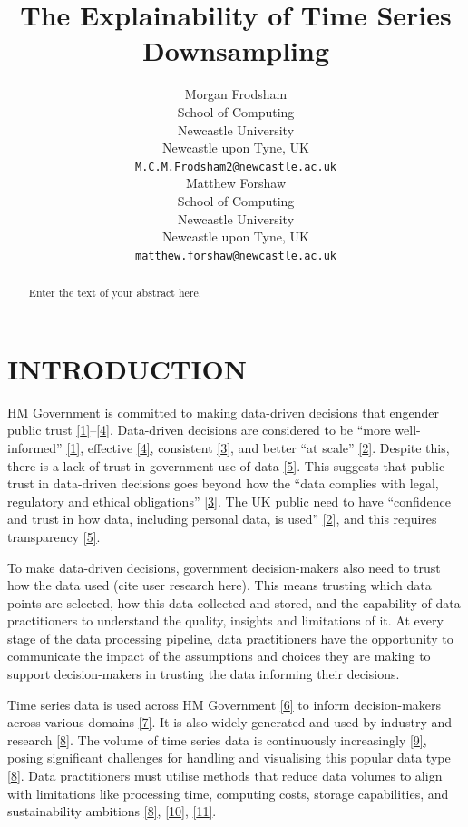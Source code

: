 \documentclass{article}
\title{The Explainability of Time Series Downsampling}
\author{
    Morgan Frodsham
   \\
    School of Computing \\
    Newcastle University \\
  Newcastle upon Tyne, UK \\
  \texttt{\href{mailto:M.C.M.Frodsham2@newcastle.ac.uk}{\nolinkurl{M.C.M.Frodsham2@newcastle.ac.uk}}} \\
   \And
    Matthew Forshaw
   \\
    School of Computing \\
    Newcastle University \\
  Newcastle upon Tyne, UK \\
  \texttt{\href{mailto:matthew.forshaw@newcastle.ac.uk}{\nolinkurl{matthew.forshaw@newcastle.ac.uk}}} \\
  }
\begin{document}
\maketitle


\begin{abstract}
Enter the text of your abstract here.
\end{abstract}


\twocolumn

\hypertarget{introduction}{%
\section{INTRODUCTION}\label{introduction}}

HM Government is committed to making data-driven decisions that engender
public trust
\protect\hyperlink{ref-data2017}{{[}1{]}}--\protect\hyperlink{ref-data2022}{{[}4{]}}.
Data-driven decisions are considered to be ``more well-informed''
\protect\hyperlink{ref-data2017}{{[}1{]}}, effective
\protect\hyperlink{ref-data2022}{{[}4{]}}, consistent
\protect\hyperlink{ref-data2021}{{[}3{]}}, and better ``at scale''
\protect\hyperlink{ref-data2020}{{[}2{]}}. Despite this, there is a lack
of trust in government use of data
\protect\hyperlink{ref-trust}{{[}5{]}}. This suggests that public trust
in data-driven decisions goes beyond how the ``data complies with legal,
regulatory and ethical obligations''
\protect\hyperlink{ref-data2021}{{[}3{]}}. The UK public need to have
``confidence and trust in how data, including personal data, is used''
\protect\hyperlink{ref-data2020}{{[}2{]}}, and this requires
transparency \protect\hyperlink{ref-trust}{{[}5{]}}.

To make data-driven decisions, government decision-makers also need to
trust how the data used (cite user research here). This means trusting
which data points are selected, how this data collected and stored, and
the capability of data practitioners to understand the quality, insights
and limitations of it. At every stage of the data processing pipeline,
data practitioners have the opportunity to communicate the impact of the
assumptions and choices they are making to support decision-makers in
trusting the data informing their decisions.

Time series data is used across HM Government
\protect\hyperlink{ref-pathway}{{[}6{]}} to inform decision-makers
across various domains \protect\hyperlink{ref-onstool}{{[}7{]}}. It is
also widely generated and used by industry and research
\protect\hyperlink{ref-TVStore}{{[}8{]}}. The volume of time series data
is continuously increasingly \protect\hyperlink{ref-datapoint}{{[}9{]}},
posing significant challenges for handling and visualising this popular
data type \protect\hyperlink{ref-TVStore}{{[}8{]}}. Data practitioners
must utilise methods that reduce data volumes to align with limitations
like processing time, computing costs, storage capabilities, and
sustainability ambitions \protect\hyperlink{ref-TVStore}{{[}8{]}},
\protect\hyperlink{ref-Sveinn}{{[}10{]}},
\protect\hyperlink{ref-Shift}{{[}11{]}}.
\end{document}
